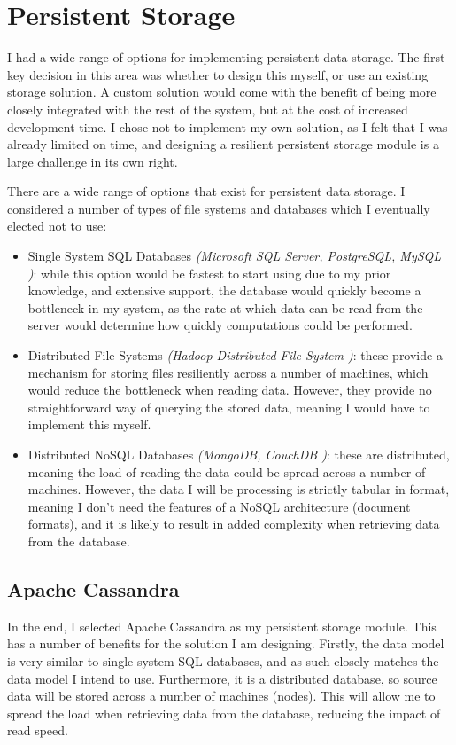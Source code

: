 \section{Persistent Storage}
I had a wide range of options for implementing persistent data storage. The first key decision in this area was whether to design this myself, or use an existing storage solution. A custom solution would come with the benefit of being more closely integrated with the rest of the system, but at the cost of increased development time. I chose not to implement my own solution, as I felt that I was already limited on time, and designing a resilient persistent storage module is a large challenge in its own right.

There are a wide range of options that exist for persistent data storage. I considered a number of types of file systems and databases which I eventually elected not to use:
\begin{itemize}
	\item Single System SQL Databases \textit{(Microsoft SQL Server, PostgreSQL, MySQL )}: while this option would be fastest to start using due to my prior knowledge, and extensive support, the database would quickly become a bottleneck in my system, as the rate at which data can be read from the server would determine how quickly computations could be performed.
	\item Distributed File Systems \textit{(Hadoop Distributed File System )}: these provide a mechanism for storing files resiliently across a number of machines, which would reduce the bottleneck when reading data. However, they provide no straightforward way of querying the stored data, meaning I would have to implement this myself.
	\item Distributed NoSQL Databases \textit{(MongoDB, CouchDB )}: these are distributed, meaning the load of reading the data could be spread across a number of machines. However, the data I will be processing is strictly tabular in format, meaning I don't need the features of a NoSQL architecture (document formats), and it is likely to result in added complexity when retrieving data from the database.
\end{itemize}

\subsection{Apache Cassandra} 
In the end, I selected Apache Cassandra  as my persistent storage module. This has a number of benefits for the solution I am designing. Firstly, the data model is very similar to single-system SQL databases, and as such closely matches the data model I intend to use. Furthermore, it is a distributed database, so source data will be stored across a number of machines (nodes). This will allow me to spread the load when retrieving data from the database, reducing the impact of read speed. 

